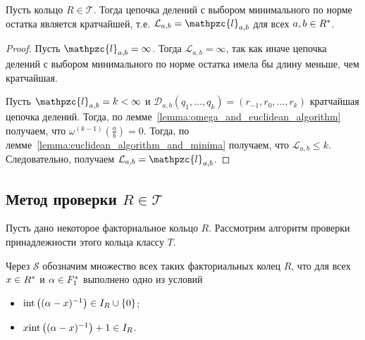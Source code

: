 \documentclass[_00_dissertation.tex]{subfiles}
\begin{document}
\begin{theorem}\label{theorem:Kroneker_Vahlen_theorem_in_UFD}
    Пусть кольцо $R \in \mathcal{T}$.
    Тогда цепочка делений с выбором минимального по норме остатка является кратчайшей, т.е. $\mathcal{L}_{a, b} = \mathpzc{l}_{a, b}$ для всех $a, b \in R^{*}$.
\end{theorem}
\begin{proof}
    Пусть $\mathpzc{l}_{a, b} = \infty$.
    Тогда $\mathcal{L}_{a, b} = \infty$, так как иначе цепочка делений с выбором минимального по норме остатка имела бы длину меньше, чем кратчайшая.

    Пусть $\mathpzc{l}_{a, b} = k < \infty$ и $\mathcal{D}_{a, b}(q_1, \dots, q_k) = (r_{-1}, r_0, \dots, r_k)$ кратчайшая цепочка делений.
    Тогда, по лемме~\ref{lemma:omega_and_euclidean_algorithm} получаем, что $\omega^{(k-1)}\left(\frac{a}{b}\right) = 0$.
    Тогда, по лемме~\ref{lemma:euclidean_algorithm_and_minima} получаем, что $\mathcal{L}_{a, b} \le k$.
    Следовательно, получаем $\mathcal{L}_{a, b} = \mathpzc{l}_{a, b}$.
\end{proof}

\subsection{Метод проверки $R \in \mathcal{T}$}

Пусть дано некоторое факториальное кольцо $R$.
Рассмотрим алгоритм проверки принадлежности этого кольца классу $T$.

\begin{definition}
    Через $\mathcal{S}$ обозначим множество всех таких факториальных колец $R$, что для всех $x \in R^{*}$ и $\alpha \in F_1^{*}$ выполнено одно из условий
    \begin{itemize}
        \item $\textrm{int}\left((\alpha - x)^{-1}\right) \in I_{R} \cup \{0\}$;
        
        \item $x \textrm{int}\left((\alpha - x)^{-1}\right) + 1 \in I_{R}$.
    \end{itemize}
\end{definition}
\end{document}

